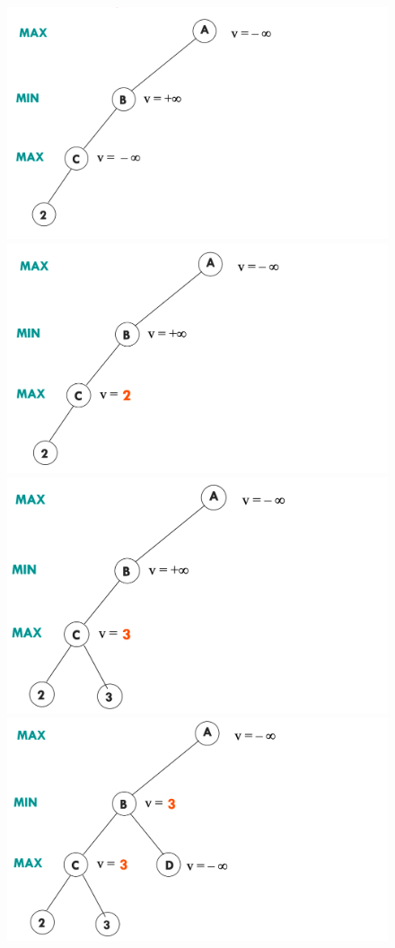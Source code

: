 \documentclass{article}
\begin{document}
\begin{figure}[H]
\centering
\includegraphics[scale=0.15]{Images/minmaxaction1.png}
\includegraphics[scale=0.15]{Images/minmaxaction2.png}
\includegraphics[scale=0.15]{Images/minmaxaction3.png}
\includegraphics[scale=0.15]{Images/minmaxaction4.png}

\end{figure}
\end{document}

